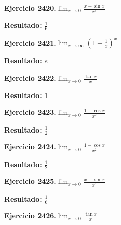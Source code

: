 \documentclass[10pt,a4paper]{article}
\begin{document}
\begin{ejbox}
\textbf{Ejercicio 2420.}\quad $\lim_{x\to 0} \frac{x-\sin x}{x^3}$
\end{ejbox}

\begin{solbox}
\textbf{Resultado:} \(\displaystyle \frac{1}{6}\)
\end{solbox}

\newpage
\begin{ejbox}
\textbf{Ejercicio 2421.}\quad $\lim_{x\to \infty} \left(1+\frac{1}{x}\right)^x$
\end{ejbox}

\begin{solbox}
\textbf{Resultado:} \(\displaystyle e\)
\end{solbox}

\begin{ejbox}
\textbf{Ejercicio 2422.}\quad $\lim_{x\to 0} \frac{\tan x}{x}$
\end{ejbox}

\begin{solbox}
\textbf{Resultado:} \(\displaystyle 1\)
\end{solbox}

\begin{ejbox}
\textbf{Ejercicio 2423.}\quad $\lim_{x\to 0} \frac{1-\cos x}{x^2}$
\end{ejbox}

\begin{solbox}
\textbf{Resultado:} \(\displaystyle \frac{1}{2}\)
\end{solbox}

\newpage
\begin{ejbox}
\textbf{Ejercicio 2424.}\quad $\lim_{x\to 0} \frac{1-\cos x}{x^2}$
\end{ejbox}

\begin{solbox}
\textbf{Resultado:} \(\displaystyle \frac{1}{2}\)
\end{solbox}

\begin{ejbox}
\textbf{Ejercicio 2425.}\quad $\lim_{x\to 0} \frac{x-\sin x}{x^3}$
\end{ejbox}

\begin{solbox}
\textbf{Resultado:} \(\displaystyle \frac{1}{6}\)
\end{solbox}

\begin{ejbox}
\textbf{Ejercicio 2426.}\quad $\lim_{x\to 0} \frac{\tan x}{x}$
\end{ejbox}
\end{document}
